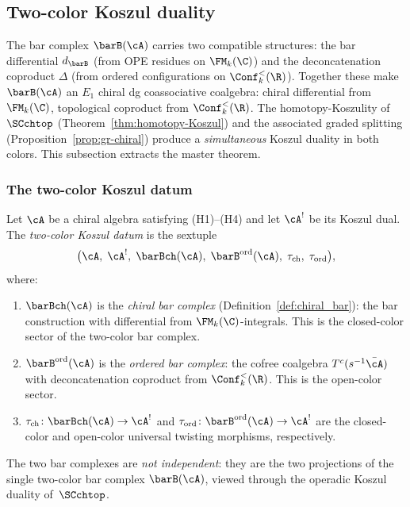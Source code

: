 
\subsection{Two-color Koszul duality}

The bar complex $\barB(\cA)$ carries two compatible structures:
the bar differential $d_{\barB}$ (from OPE residues on
$\FM_k(\C)$) and the deconcatenation coproduct $\Delta$
(from ordered configurations on $\Conf_k^{<}(\R)$).
Together these make $\barB(\cA)$ an $E_1$ chiral dg
coassociative coalgebra: chiral differential from
$\FM_k(\C)$, topological coproduct from $\Conf_k^{<}(\R)$.
The homotopy-Koszulity of $\SCchtop$
(Theorem~\ref{thm:homotopy-Koszul}) and the associated graded
splitting (Proposition~\ref{prop:gr-chiral}) produce a
\emph{simultaneous} Koszul duality in both colors. This
subsection extracts the master theorem.

\subsubsection*{The two-color Koszul datum}

\begin{definition}
Let $\cA$ be a chiral algebra satisfying (H1)--(H4) and
let $\cA^!$ be its Koszul dual. The \emph{two-color Koszul
datum} is the sextuple
\[
\bigl(\cA,\; \cA^!,\;
\barBch(\cA),\; \barB^{\mathrm{ord}}(\cA),\;
\tau_{\mathrm{ch}},\; \tau_{\mathrm{ord}}\bigr),
\]
where:
\begin{enumerate}[label=\textup{(\roman*)}]
\item $\barBch(\cA)$ is the \emph{chiral bar complex}
 (Definition~\ref{def:chiral_bar}): the bar construction with
 differential from $\FM_k(\C)$-integrals. This is the
 closed-color sector of the two-color bar complex.
\item $\barB^{\mathrm{ord}}(\cA)$ is the \emph{ordered bar
 complex}: the cofree coalgebra $T^c(s^{-1}\bar{\cA})$ with
 deconcatenation coproduct from $\Conf_k^{<}(\R)$. This is
 the open-color sector.
\item $\tau_{\mathrm{ch}} \colon \barBch(\cA) \to \cA^!$ and
 $\tau_{\mathrm{ord}} \colon \barB^{\mathrm{ord}}(\cA) \to
 \cA^!$ are the closed-color and open-color universal twisting
 morphisms, respectively.
\end{enumerate}
The two bar complexes are \emph{not independent}: they are the
two projections of the single two-color bar complex
$\barB(\cA)$, viewed through the operadic Koszul duality
of~$\SCchtop$.
\end{definition}

